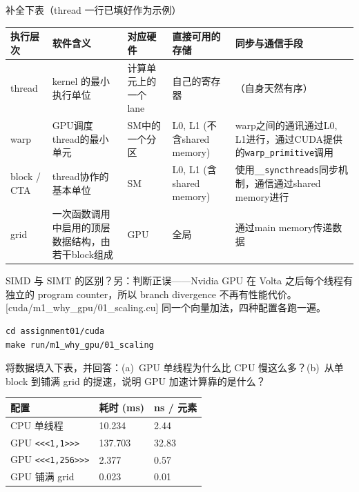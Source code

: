 \documentclass[11pt,a4paper,fontset=none]{ctexart}
\begin{document}
补全下表（thread 一行已填好作为示例）

\begin{center}\small
\begin{tabular}{@{}p{5.2em}p{9em}p{7.5em}p{7.5em}p{8em}@{}}
\toprule
执行层次 & 软件含义 & 对应硬件 & 直接可用的存储 & 同步与通信手段 \\
\midrule
thread & kernel 的最小执行单位 & 计算单元上的一个 lane & 自己的寄存器 & （自身天然有序） \\
warp & GPU调度thread的最小单元 & SM中的一个分区 & L0, L1 (不含shared memory) & warp之间的通讯通过L0, L1进行，通过CUDA提供的\texttt{warp\_primitive}调用 \\
block / CTA & thread协作的基本单位 & SM & L0, L1 (含shared memory) & 使用\texttt{\_\_syncthreads}同步机制，通信通过shared memory进行 \\
grid & 一次函数调用中启用的顶层数据结构，由若干block组成 & GPU & 全局 & 通过main memory传递数据 \\
\bottomrule
\end{tabular}
\end{center}

SIMD 与 SIMT 的区别？另：判断正误——Nvidia GPU 在 Volta 之后每个线程有独立的 program counter，所以 branch divergence 不再有性能代价。
[cuda/m1\_why\_gpu/01\_scaling.cu]
同一个向量加法，四种配置各跑一遍。

\begin{lstlisting}
cd assignment01/cuda
make run/m1_why_gpu/01_scaling
\end{lstlisting}

将数据填入下表，并回答：(a)~GPU 单线程为什么比 CPU 慢这么多？(b)~从单 block 到铺满 grid 的提速，说明 GPU 加速计算靠的是什么？

\begin{center}\small
\begin{tabular}{@{}lll@{}}
\toprule
配置 & 耗时 (ms) & ns / 元素 \\
\midrule
CPU 单线程 & 10.234 & 2.44 \\
GPU \texttt{<<<1,1>>>} & 137.703 & 32.83 \\
GPU \texttt{<<<1,256>>>} & 2.377 & 0.57 \\
GPU 铺满 grid & 0.023 & 0.01 \\
\bottomrule
\end{tabular}
\end{center}
\end{document}
